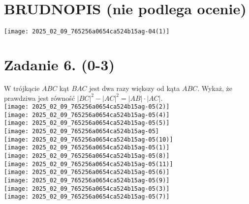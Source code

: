 \documentclass[10pt]{article}
\begin{document}
\section*{BRUDNOPIS (nie podlega ocenie)}
\begin{center}
\texttt{[image: 2025\_02\_09\_765256a0654ca524b15ag-04(1)]}
\end{center}

\section*{Zadanie 6. (0-3)}
W trójkącie \(A B C\) kąt \(B A C\) jest dwa razy większy od kąta \(A B C\). Wykaż, że prawdziwa jest równość \(|B C|^{2}-|A C|^{2}=|A B| \cdot|A C|\).\\
\(\qquad\)\\
\texttt{[image: 2025\_02\_09\_765256a0654ca524b15ag-05(2)]}\\
\(\qquad\)\\
\texttt{[image: 2025\_02\_09\_765256a0654ca524b15ag-05(4)]}\\
\texttt{[image: 2025\_02\_09\_765256a0654ca524b15ag-05(5)]}\\
\(\qquad\)\\
\texttt{[image: 2025\_02\_09\_765256a0654ca524b15ag-05]}\\
\(\qquad\)\\
\(\qquad\)\\
\(\qquad\)\\
\texttt{[image: 2025\_02\_09\_765256a0654ca524b15ag-05(10)]}\\
\(\qquad\)\\
\(\qquad\)\\
\(\qquad\)\\
\texttt{[image: 2025\_02\_09\_765256a0654ca524b15ag-05(1)]}\\
\texttt{[image: 2025\_02\_09\_765256a0654ca524b15ag-05(8)]}\\
\(\qquad\)\\
\(\qquad\)\\
\texttt{[image: 2025\_02\_09\_765256a0654ca524b15ag-05(11)]}\\
\(\qquad\)\\
\texttt{[image: 2025\_02\_09\_765256a0654ca524b15ag-05(6)]}\\
\(\qquad\)\\
\texttt{[image: 2025\_02\_09\_765256a0654ca524b15ag-05(9)]}\\
\texttt{[image: 2025\_02\_09\_765256a0654ca524b15ag-05(3)]}\\
\texttt{[image: 2025\_02\_09\_765256a0654ca524b15ag-05(7)]}\\
\(\qquad\)
\end{document}
